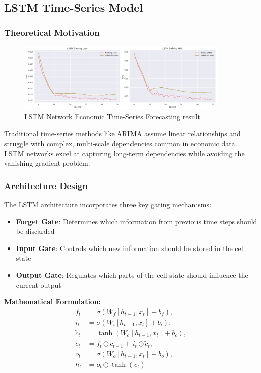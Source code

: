 \subsection{LSTM Time-Series Model}\label{subsec:lstm}



\subsubsection{Theoretical Motivation}
\begin{figure}[H]
    \centering
    \includegraphics[width=0.9\textwidth]{figures/lstm.jpg}
    \caption{LSTM Network Economic Time-Series Forecasting result}
    \label{fig:lstm_architecture}
\end{figure}

Traditional time-series methods like ARIMA assume linear relationships and struggle with complex, multi-scale dependencies common in economic data. LSTM networks excel at capturing long-term dependencies while avoiding the vanishing gradient problem.

\subsubsection{Architecture Design}
The LSTM architecture incorporates three key gating mechanisms:
\begin{itemize}
    \item \textbf{Forget Gate}: Determines which information from previous time steps should be discarded
    \item \textbf{Input Gate}: Controls which new information should be stored in the cell state
    \item \textbf{Output Gate}: Regulates which parts of the cell state should influence the current output
\end{itemize}

\textbf{Mathematical Formulation:}
\begin{align}
  f_t &= \sigma(W_f [h_{t-1}, x_t] + b_f), \\
  i_t &= \sigma(W_i [h_{t-1}, x_t] + b_i), \\
  \tilde{c}_t &= \tanh(W_c [h_{t-1}, x_t] + b_c), \\
  c_t &= f_t \odot c_{t-1} + i_t \odot \tilde{c}_t, \\
  o_t &= \sigma(W_o [h_{t-1}, x_t] + b_o), \\
  h_t &= o_t \odot \tanh(c_t)
\end{align}

